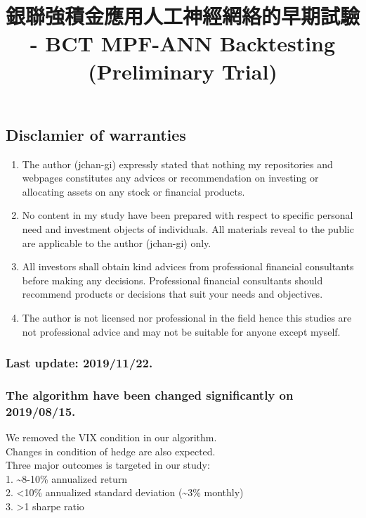 \documentclass[]{article}
\title{銀聯強積金應用人工神經網絡的早期試驗 - BCT MPF-ANN Backtesting
(Preliminary Trial)}
\author{}
\date{}
\providecommand{\tightlist}{%
  \setlength{\itemsep}{0pt}\setlength{\parskip}{0pt}}
\begin{document}
\maketitle

\hypertarget{disclamier-of-warranties}{%
\subsection{Disclamier of warranties}\label{disclamier-of-warranties}}

\begin{enumerate}
\def\labelenumi{\arabic{enumi}.}
\tightlist
\item
  The author (jchan-gi) expressly stated that nothing my repositories
  and webpages constitutes any advices or recommendation on investing or
  allocating assets on any stock or financial products.\\
\item
  No content in my study have been prepared with respect to specific
  personal need and investment objects of individuals. All materials
  reveal to the public are applicable to the author (jchan-gi) only.
\item
  All investors shall obtain kind advices from professional financial
  consultants before making any decisions. Professional financial
  consultants should recommend products or decisions that suit your
  needs and objectives.\\
\item
  The author is not licensed nor professional in the field hence this
  studies are not professional advice and may not be suitable for anyone
  except myself.
\end{enumerate}

\hypertarget{last-update-20191122.}{%
\subsubsection{Last update: 2019/11/22.}\label{last-update-20191122.}}

\hypertarget{the-algorithm-have-been-changed-significantly-on-20190815.}{%
\subsubsection{The algorithm have been changed significantly on
2019/08/15.}\label{the-algorithm-have-been-changed-significantly-on-20190815.}}

We removed the VIX condition in our algorithm.\\
Changes in condition of hedge are also expected.\\
Three major outcomes is targeted in our study:\\
1. \textasciitilde{}8-10\% annualized return\\
2. \textless{}10\% annualized standard deviation (\textasciitilde{}3\%
monthly)\\
3. \textgreater{}1 sharpe ratio
\end{document}

